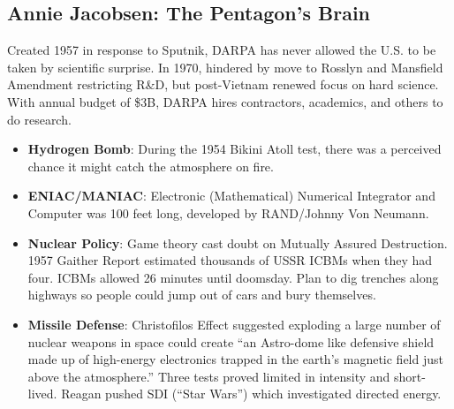 \documentclass[
]{article}
\begin{document}
\hypertarget{annie-jacobsen-the-pentagons-brain}{%
\subsection{Annie Jacobsen: The Pentagon's
Brain}\label{annie-jacobsen-the-pentagons-brain}}

Created 1957 in response to Sputnik, DARPA has never allowed the U.S. to
be taken by scientific surprise. In 1970, hindered by move to Rosslyn
and Mansfield Amendment restricting R\&D, but post-Vietnam renewed focus
on hard science. With annual budget of \$3B, DARPA hires contractors,
academics, and others to do research.

\begin{itemize}
\item
  \textbf{Hydrogen Bomb}: During the 1954 Bikini Atoll test, there was a
  perceived chance it might catch the atmosphere on fire.
\item
  \textbf{ENIAC/MANIAC}: Electronic (Mathematical) Numerical Integrator
  and Computer was 100 feet long, developed by RAND/Johnny Von Neumann.
\item
  \textbf{Nuclear Policy}: Game theory cast doubt on Mutually Assured
  Destruction. 1957 Gaither Report estimated thousands of USSR ICBMs
  when they had four. ICBMs allowed 26 minutes until doomsday. Plan to
  dig trenches along highways so people could jump out of cars and bury
  themselves.
\item
  \textbf{Missile Defense}: Christofilos Effect suggested exploding a
  large number of nuclear weapons in space could create ``an Astro-dome
  like defensive shield made up of high-energy electronics trapped in
  the earth's magnetic field just above the atmosphere.'' Three tests
  proved limited in intensity and short-lived. Reagan pushed SDI (``Star
  Wars'') which investigated directed energy.


\end{itemize}
\end{document}
